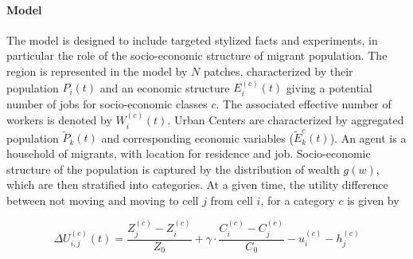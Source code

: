 


\paragraph{Model}


The model is designed to include targeted stylized facts and experiments, in particular the role of the socio-economic structure of migrant population. %
 The region is represented in the model by $N$ patches, characterized by their population $P_i(t)$ and an economic structure $E_i^{(c)}(t)$ giving a potential number of jobs for socio-economic classes $c$. The associated effective number of workers is denoted by $W_i^{(c)}(t)$.%
 Urban Centers are characterized by aggregated population $\tilde{P}_k(t)$ and corresponding economic variables ($\tilde{E}_k^{c}(t)$). An agent is a household of migrants, with location for residence and job. Socio-economic structure of the population is captured by the distribution of wealth $g(w)$, which are then stratified into categories. At a given time, the utility difference between not moving and moving to cell $j$ from cell $i$, for a category $c$ is given by

\[
\Delta U_{i,j}^{(c)}(t) = \frac{Z_j^{(c)}- Z_i^{(c)}}{Z_0} + \gamma \cdot \frac{C_i^{(c)}- C_j^{(c)}}{C_0} - u_i^{(c)} - h_j^{(c)}
\]


